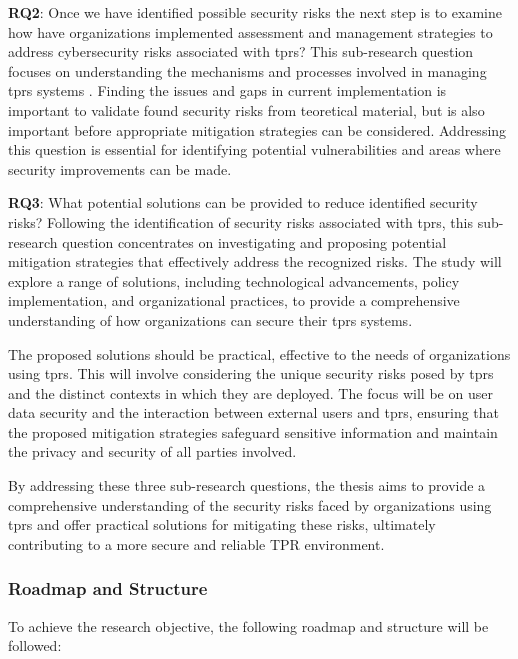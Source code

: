 \textbf{RQ2}: Once we have identified possible security risks the next step is to examine how have organizations implemented assessment and management strategies to address cybersecurity risks associated
  with \ac{tprs}? This sub-research question focuses on understanding the mechanisms and processes involved in managing \ac{tprs} systems
. Finding the issues and gaps in current implementation is important to validate found security risks from teoretical material, but is
also important before appropriate mitigation strategies can be considered. Addressing this question is essential for
identifying potential vulnerabilities and areas where security improvements can be made.

\textbf{RQ3}: What potential solutions can be provided to reduce identified security risks?
  Following the identification of security risks associated with \ac{tprs}, this sub-research question concentrates on investigating and proposing potential mitigation strategies that effectively address the recognized risks. The study will explore a range of solutions, including technological advancements, policy implementation, and organizational practices, to provide a comprehensive understanding of how organizations can secure their \ac{tprs} systems.

  The proposed solutions should be practical, effective to the needs of organizations using \ac{tprs}.
  This will involve considering the unique security risks posed by \ac{tprs} and the distinct contexts in which they are deployed.
  The focus will be on user data security and the interaction between external users and \ac{tprs}, ensuring that the proposed mitigation strategies safeguard sensitive information and maintain the privacy and security of all parties involved.


By addressing these three sub-research questions, the thesis aims to provide a comprehensive understanding of the security risks faced by organizations using \ac{tprs} and offer practical solutions for mitigating these risks, ultimately contributing to a more secure and reliable TPR environment.

\subsubsection{Roadmap and Structure}

To achieve the research objective, the following roadmap and structure will be followed:

